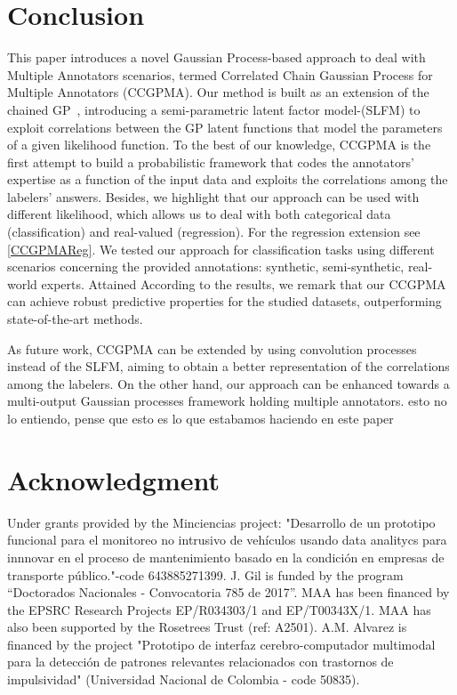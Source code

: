 \documentclass[journal]{IEEEtran}
\newcommand{\comment}[2]{{\color{blue}#1} {\color{red}#2}}
\begin{document}



\section{Conclusion}
This paper introduces a novel Gaussian Process-based approach to deal
with Multiple Annotators scenarios, termed Correlated Chain Gaussian
Process for Multiple Annotators (CCGPMA). Our method is built as an
extension of the chained GP~\cite{saul2016chained}, introducing a
semi-parametric latent factor model-(SLFM) to exploit correlations
between the GP latent functions that model the parameters of a given
likelihood function. To the best of our knowledge, CCGPMA is the first
attempt to build a probabilistic framework that codes the annotators'
expertise as a function of the input data and exploits the
correlations among the labelers' answers. Besides, we highlight that
our approach can be used with different likelihood, which allows us to
deal with both categorical data (classification) and real-valued
(regression). For the regression extension see \cref{CCGPMAReg}. We
tested our approach for classification tasks using different scenarios
concerning the provided annotations: synthetic, semi-synthetic,
real-world experts. \comment{Attained}{According} to the results, we remark that our CCGPMA
can achieve robust predictive properties for the studied datasets,
outperforming state-of-the-art methods.

As future work, CCGPMA can be extended by using convolution
processes~\cite{alvarez2011computationally} instead of the SLFM,
aiming to obtain a better representation of the correlations among the
labelers. \comment{On the other hand, our approach can be enhanced towards a
multi-output Gaussian processes framework holding multiple
annotators.}{esto no lo entiendo, pense que esto es lo que estabamos
haciendo en este paper}

\section*{Acknowledgment}
Under grants provided by the Minciencias project: "Desarrollo de un prototipo funcional para el monitoreo no intrusivo de veh\'iculos
usando data analitycs para innnovar en el proceso de mantenimiento basado en la condici\'on en empresas de transporte p\'ublico."-code 643885271399. J. Gil is funded by the program ``Doctorados Nacionales - Convocatoria 785 de 2017''. MAA has been financed by the EPSRC Research Projects EP/R034303/1 and EP/T00343X/1. MAA has also been supported by the Rosetrees Trust (ref: A2501). A.M. Alvarez is financed by the project "Prototipo de interfaz cerebro-computador multimodal para la detección de patrones
relevantes relacionados con trastornos de impulsividad" (Universidad Nacional de Colombia - code 50835).
\end{document}
